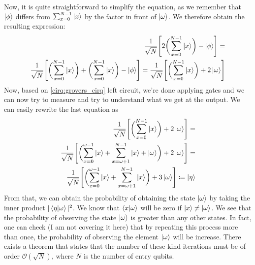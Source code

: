 Now, it is quite straightforward to simplify the equation, as we remember that $\ket{\phi}$ differs from $ \sum_{x=0}^{N-1}\ket{x}$ by the factor in front of $\ket{\omega}$. 
We therefore obtain the resulting expression:
\begin{equation}
  \begin{split}
    \frac{1}{\sqrt{N}}\Biggl[2\biggl( \sum_{x=0}^{N-1}\ket{x}\biggr) - \ket{\phi }\Biggr] = \\ 
    \frac{1}{\sqrt{N}}\Biggl[\biggl( \sum_{x=0}^{N-1}\ket{x}\biggr)+ \biggl( \sum_{x=0}^{N-1}\ket{x}\biggr) - \ket{\phi }\Biggr] =  
    \frac{1}{\sqrt{N}}\Biggl[\biggl( \sum_{x=0}^{N-1}\ket{x}\biggr)+ 2\ket{\omega}\Biggr]
  \end{split}
\end{equation}
Now, based on \autoref{cirq:grovers_cirq} left circuit, we're done applying gates and we can now try to measure and try to understand what we get at the output.
We can easily rewrite the last equation as 
\begin{equation}
  \begin{split}
    \frac{1}{\sqrt{N}}\Biggl[\biggl( \sum_{x=0}^{N-1}\ket{x}\biggr)+ 2\ket{\omega}\Biggr] = \\
    \frac{1}{\sqrt{N}}\Biggl[\biggl( \sum_{x=0}^{\omega-1}\ket{x} + \sum_{x=\omega + 1}^{N-1}\ket{x} +\ket{\omega} \biggr)+ 2\ket{\omega}\Biggr] = \\
    \frac{1}{\sqrt{N}}\Biggl[\biggl( \sum_{x=0}^{\omega-1}\ket{x} + \sum_{x=\omega + 1}^{N-1}\ket{x} \biggr)+ 3\ket{\omega}\Biggr] \coloneqq \ket{\eta}
    \end{split}
  \end{equation}
  From that, we can obtain the probability of obtaining the state $\ket{\omega}$ by taking the inner product $|\bra{\eta}\ket{\omega}|^2$. 
  We know that $\bra{x}\ket{\omega}$ will be zero if $\ket{x}\neq \ket{\omega}$. We see that the probability of observing the 
  state $\ket{\omega}$ is greater than any other states. In fact, one can check (I am not covering it here) that by repeating this process more than once, the probability 
  of observing the element $\ket{\omega}$ will be increase. There exists a theorem that states that the number of these kind iterations must be of order $\mathcal{O}(\sqrt{N})$, where 
  $N$ is the number of entry qubits.




